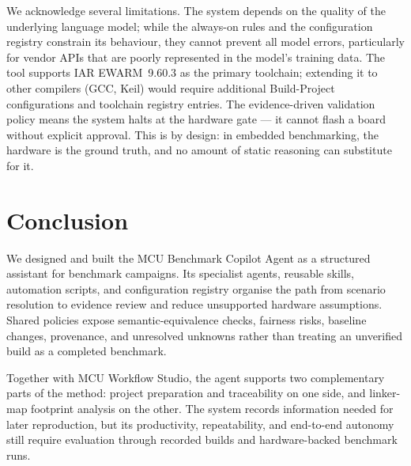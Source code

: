 We acknowledge several limitations. The system depends on the quality of the underlying
language model; while the always-on rules and the configuration registry constrain its
behaviour, they cannot prevent all model errors, particularly for vendor APIs that are
poorly represented in the model's training data. The tool supports IAR EWARM~9.60.3 as the
primary toolchain; extending it to other compilers (GCC, Keil) would require additional
Build-Project configurations and toolchain registry entries. The evidence-driven validation
policy means the system halts at the hardware gate --- it cannot flash a board without
explicit approval. This is by design: in embedded benchmarking, the hardware is the ground
truth, and no amount of static reasoning can substitute for it.

\section*{Conclusion}

We designed and built the MCU Benchmark Copilot Agent as a structured assistant for benchmark
campaigns. Its specialist agents, reusable skills, automation scripts, and configuration
registry organise the path from scenario resolution to evidence review and reduce unsupported
hardware assumptions. Shared policies expose semantic-equivalence checks, fairness risks,
baseline changes, provenance, and unresolved unknowns rather than treating an unverified build
as a completed benchmark.

Together with MCU Workflow Studio, the agent supports two complementary parts of the method:
project preparation and traceability on one side, and linker-map footprint analysis on the
other. The system records information needed for later reproduction, but its productivity,
repeatability, and end-to-end autonomy still require evaluation through recorded builds and
hardware-backed benchmark runs.

\pagebreak